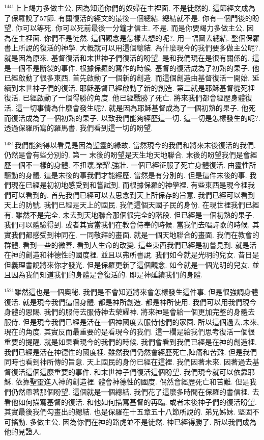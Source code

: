 \documentclass{book}
\begin{document}
$^{1441}$上上竭力多做主公.
因為知道你們的奴婦在主裡面.
不是徒然的.
這節經文成為了保羅說了57節.
有關復活的經文的最後一個總結.
總結就不是.
你有一個門後的盼望.
你可以等死.
你可以死前最後一分鐘才信主.
不是.
而是你要竭力多做主公.
因為在主裡面.
你們不是徒然.
這個觀念是怎樣去想的呢?.
用一幅圖去總結.
整個保羅書上所說的復活的神學.
大概就可以用這個總結.
為什麼現今的我們要多做主公呢?.
就是因為原來.
基督復活和末世神子們復活的盼望.
是和我們現在是很有關係的.
這是一個不是斷裂的事件.
根據保羅的寫作的時候.
基督的復活成為了初熟的果子.
他已經啟動了很多東西.
首先啟動了一個新的創造.
而這個創造由基督復活一開始.
延續到末世神子們的復活.
耶穌基督已經啟動了新的創造.
第二就是耶穌基督從死裡復活.
已經啟動了一個得勝的角度.
他已經戰勝了死亡.
將來我們都會經歷身體復活.
這一切事情為什麼會發生呢?.
就是因為耶穌基督成為了一個初熟的果子.
他死而復活成為了一個初熟的果子.
以致我們能夠經歷這一切.
這一切是怎樣發生的呢?.
透過保羅所寫的羅馬書.
我們看到這一切的盼望.

$^{1481}$我們能夠得以看見是因為聖靈的緣故.
當然現今的我們和將來末後復活的我們.
仍然是會有些分別的.
第一 末後的盼望是天生地天地聯合.
末後的盼望我們是會經歷一個不一樣的身體.
不扭壞,榮耀,強壯.
一個已經征服了死亡身體復活.
由靈性所驅動的身體.
這是末後的事我們才能經歷.
當然是有分別的.
但是這件末後的事.
我們現在已經是初初地感受到和嘗試到.
而根據保羅的神學裡.
有些東西是現今裡我們可以看到的.
首先我們已經可以去思念到天上所保存的旨意.
我們已經可以看到天上的防號.
我們已經是天上的國民.
我們這個天國子民的身份.
在現世裡我們已經有.
雖然不是完全.
未去到天地聯合那個很完全的階段.
但已經是一個初熟的果子.
我們可以體驗得到.
或者其實當我們在教會侍奉的時候.
當我們去唱詩歌的時候.
其實我們都感受到神同在.
一同敬拜的畫面.
就是一個天地聯合的畫面.
我們在教會的群體.
看到一些的微善.
看到人生命的改變.
這些東西我們已經是初嘗見到.
就是活在神的創造和神德性的國度裡.
並且以弗所書說.
我們如今就是光明的兒女.
昔日是但義理書說將來你才發光.
但是保羅更新了這個觀念.
如今就是一個光明的兒女.
並且因為我們知道我們的身體是會復活的.
即是神延續我們的身體.

$^{1521}$雖然這也是一個奧秘.
我們是不會知道將來會怎樣發生這件事.
但是很強調身體復活.
就是現今我們這個身體.
都是神所創造.
都是神所使用.
我們可以用我們現今身體的恩賜.
我們的服侍去服侍神去榮耀神.
將來神是會給一個更加完整的身體去服侍.
但是現今我們已經是活在一個神國度去服侍他們的家園.
所以這個過去,未來,現在的角度.
其實反而最重要的是看現今的我們.
這一欄是給我們思考復活一個很重要的提醒.
就是如果看現今的我們的時候.
我們會看到我們已經是在神的創造裡.
我們已經是活在神德性的國度裡.
雖然我們仍然會經歷死亡,陣痛和苦難.
但是我們同時也看到神所傳的旨意.
天上國民的身份已經在這裡.
我們因著未來.
因著過去基督復活這個這麼重要的事件.
和末世神子們復活這個盼望.
我們現今就可以依靠耶穌.
依靠聖靈進入神的創造裡.
體會神德性的國度.
偶然會經歷死亡和苦難.
但是我們仍然帶著那個盼望.
這個就是一個總結.
我們花了這麼多時間在保羅的書信裡.
去看他如何描寫基督的復活.
和他如何描寫基督的再臨.
或者末後神子們的復活盼望.
其實最後我們勾畫出的總結.
也是保羅在十五章五十八節所說的.
弟兄姊妹.
堅固不可搖動.
多做主公.
因為你們在神的路虎並不是徒然.
神已經得勝了.
所以我們成為他的見證人.
\end{document}

